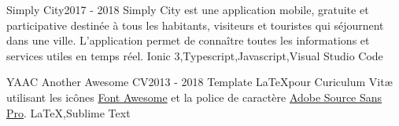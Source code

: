 

\begin{projects}
	\project
	{Simply City}{2017 - 2018}
	{  }
	{Simply City est une application mobile, gratuite et participative destinée à tous les habitants, visiteurs et touristes qui séjournent dans une ville. L’application permet de connaître toutes les informations et services utiles en temps réel.}
	{Ionic 3,Typescript,Javascript,Visual Studio Code}
				
	\project
	{YAAC Another Awesome CV}{2013 - 2018}
	{ }
	{Template \LaTeX pour Curiculum Vitæ utilisant les icônes \href{https://fontawesome.com}{Font Awesome} et la police de caractère \href{https://fonts.google.com/specimen/Source+Sans+Pro}{Adobe Source Sans Pro}.}
	{\LaTeX,Sublime Text}

\end{projects}